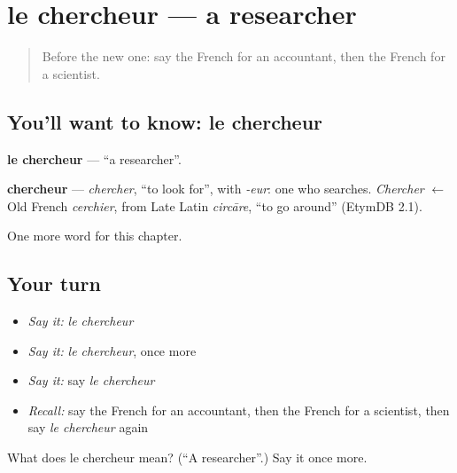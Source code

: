 \section[le chercheur]{le chercheur — a researcher}

\label{lesson:FR-C224-chercheur}



\begin{quote}
Before the new one: say the French for an accountant, then the French for a scientist.
\end{quote}

\subsection*{You'll want to know: le chercheur}
\textbf{le chercheur} — \textquotedblleft{}a researcher\textquotedblright{}.

\begin{cousinweb}
\textbf{chercheur} — \emph{chercher}, \textquotedblleft{}to look for\textquotedblright{}, with \emph{-eur}: one who searches. \emph{Chercher} $\leftarrow$ Old French \emph{cerchier}, from Late Latin \emph{circāre}, \textquotedblleft{}to go around\textquotedblright{} (EtymDB 2.1).
\end{cousinweb}

\begin{grammarlens}[title={What you've built}]
One more word for this chapter.
\end{grammarlens}

\subsection*{Your turn}
\begin{itemize}
\raggedright
  \item \emph{Say it:} \emph{le chercheur}
  \item \emph{Say it:} \emph{le chercheur}, once more
  \item \emph{Say it:} say \emph{le chercheur}
  \item \emph{Recall:} say the French for an accountant, then the French for a scientist, then say \emph{le chercheur} again
\end{itemize}

\begin{tcolorbox}[breakable,colback=teal!4,colframe=teal!35!black,title={Before you move on}]
What does le chercheur mean? (\textquotedblleft{}A researcher\textquotedblright{}.) Say it once more.
\end{tcolorbox}
